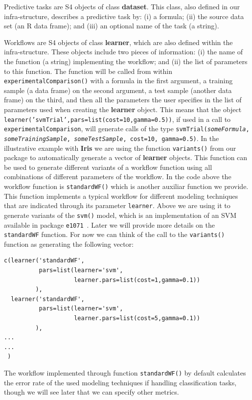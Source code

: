\documentclass[10pt,a4paper]{article}\usepackage[]{graphicx}\usepackage[]{color}
\begin{document}
Predictive tasks are S4 objects of class
\textbf{dataset}. This class, also defined in our infra-structure,
describes a predictive task by: (i) a formula; (ii) the source data
set (an R data frame); and (iii) an optional name of the task (a
string). 

Workflows are S4 objects of class \textbf{learner}, which are also
defined within the infra-structure. These objects include two pieces
of information: (i) the name of the function (a string) implementing the
workflow; and (ii) the list of parameters to this function. The
function will be called from within 
\texttt{experimentalComparison()}  with a formula in the first
argument, a training sample (a data frame) on the second argument, a
test sample (another data frame) on the third, and then all the parameters
the user specifies in the list of parameters used when creating the
\textbf{learner} object. This means that the object
\texttt{learner('svmTrial',pars=list(cost=10,gamma=0.5))}, if used in a
call to \texttt{experimentalComparison}, will 
 generate calls of the type
\texttt{svmTrial(\textit{someFormula}, \textit{someTrainingSample}, \textit{someTestSample}, cost=10,
  gamma=0.5)}. In the illustrative example with \textbf{Iris} we are using the function \texttt{variants()} from our package to automatically
generate a vector of \textbf{learner} objects. This function can be used
to generate different variants of a workflow function using all
combinations of different parameters of the workflow. In the code
above the workflow function is \texttt{standardWF()} which is another
auxiliar function we provide. This function implements a typical
workflow for different modeling techniques that are indicated through
its parameter \texttt{learner}. Above we are using it to generate
variants of the \texttt{svm()} model, which is an implementation of an SVM available in package \texttt{e1071}~\cite{}.  Later we will provide
more details on the \texttt{standardWF} function. For now we can think of the call
to the \texttt{variants()} function as generating the following vector:\linebreak
\begin{verbatim}
c(learner('standardWF',
          pars=list(learner='svm',
                    learner.pars=list(cost=1,gamma=0.1))
         ), 
  learner('standardWF',
          pars=list(learner='svm',
                    learner.pars=list(cost=5,gamma=0.1))
         ),
...
...
 ) 
\end{verbatim}
 
The workflow implemented through function \texttt{standardWF()} by
default calculates the error rate of the used modeling techniques if
handling classification tasks, though we will see later that we can
specify other metrics.
\end{document}
